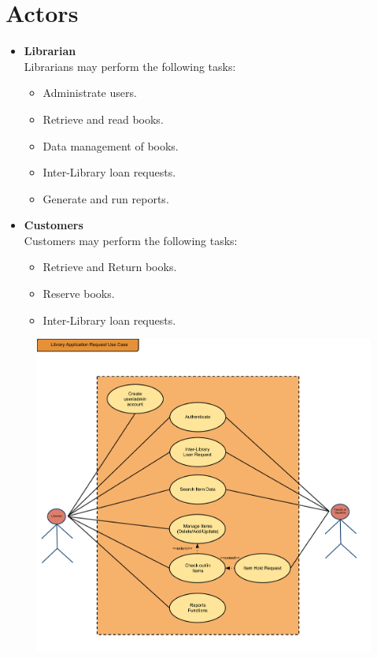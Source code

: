 \documentclass[11pt,a4paper]{article}
\begin{document}
\section{Actors}
\begin{itemize}
\item \textbf{Librarian}\\
Librarians may perform the following tasks:\\
\begin{itemize}
\item Administrate users.
\item Retrieve and read books.
\item Data management of books.
\item Inter-Library loan requests.
\item Generate and run reports.
\end{itemize}
\item \textbf{Customers}\\
Customers may perform the following tasks:\\
\begin{itemize}
\item Retrieve and Return books.
\item Reserve books.
\item Inter-Library loan requests.
\end{itemize}
\end{itemize}
\begin{figure}[Library Application Use Case]
\includegraphics[scale=0.5]{CS434-UML-WK1}
\end{figure}
\clearpage
\end{document}
